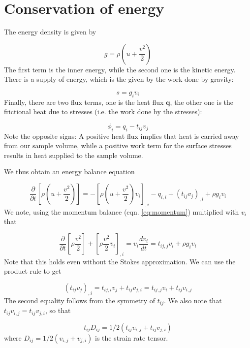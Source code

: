 \documentclass[12pt, openany]{memoir}
\newcommand{\pder}[2]{\ensuremath{\frac{\partial #1}{\partial #2}}}
\begin{document}
\section{Conservation of energy}

The energy density is given by

\begin{equation}
g = \rho (u + \frac{v^2}{2})
\end{equation}
The first term is the inner energy, while the second one is the
kinetic energy. There is a supply of energy, which is the given by the
work done by gravity:

\begin{equation}
s=g_i v_i
\end{equation}
Finally, there are two flux terms, one is the heat flux $\mathbf{q}$,
the other one is the frictional heat due to stresses (i.e. the work
done by the stresses):

\begin{equation}
\phi_i = q_i - t_{ij} v_j
\end{equation}
Note the opposite signs: A positive heat flux implies that heat is
carried away from our sample volume, while a positive work term for
the surface stresses results in heat supplied to the sample volume. 

We thus obtain an energy balance equation

\begin{equation}
\pder{}{t} \left[ \rho \left( u + \frac{v^2}{2} \right) \right] = -
\left[ \rho \left( u + \frac{v^2}{2} \right) v_i \right]_{,i} -
q_{i,i} + (t_{ij}v_j)_{,i} + \rho g_i v_i
\end{equation}
We note, using the momentum balance (eqn. \ref{eq:momentum})
multiplied with $v_i$ that

\begin{equation}
\pder{}{t} \left[ \rho \frac{v^2}{2} \right] +
\left[ \rho \frac{v^2}{2} v_i \right]_{,i} = v_i \frac{d v_i}{dt} =
t_{ij,j}v_i + \rho g_i v_i 
\end{equation}
Note that this holds even without the Stokes approximation. We can use
the product rule to get

\begin{equation}
(t_{ij}v_j)_{,i} = t_{ij,i}v_j + t_{ij}v_{j,i} = t_{ij,j}v_i +
  t_{ij}v_{i,j}
\end{equation}
The second equality follows from the symmetry of $t_{ij}$. We also
note that $t_{ij}v_{i,j} = t_{ij}v_{j,i}$, so that

\begin{equation}
t_{ij}D_{ij} = 1/2(t_{ij}v_{i,j} + t_{ij}v_{j,i})
\end{equation}
where $D_{ij} = 1/2 (v_{i,j} + v_{j,i})$ is the strain rate tensor.
\end{document}
